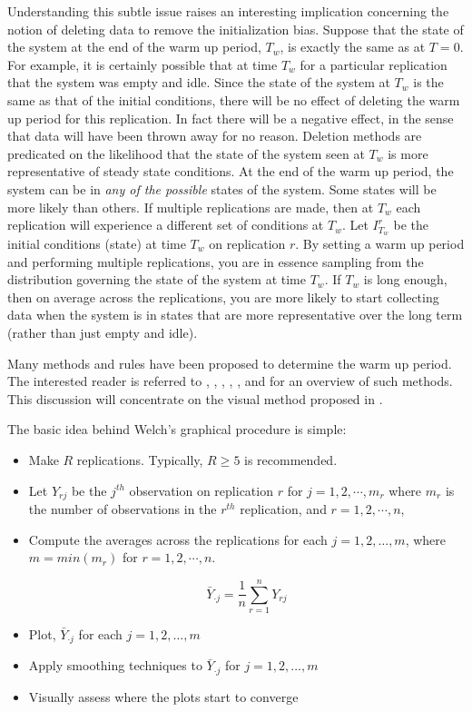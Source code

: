 \documentclass[
]{book}
\theoremstyle{definition}
\theoremstyle{definition}
\theoremstyle{definition}
\theoremstyle{definition}
\theoremstyle{remark}
\begin{document}
Understanding this subtle issue raises an interesting implication
concerning the notion of deleting data to remove the initialization
bias. Suppose that the state of the system at the end of the warm up
period, \(T_w\), is exactly the same as at \(T = 0\). For example, it is
certainly possible that at time \(T_w\) for a particular replication that
the system was empty and idle. Since the state of the system at \(T_w\) is
the same as that of the initial conditions, there will be no effect of
deleting the warm up period for this replication. In fact there will be
a negative effect, in the sense that data will have been thrown away for
no reason. Deletion methods are predicated on the likelihood that the
state of the system seen at \(T_w\) is more representative of steady state
conditions. At the end of the warm up period, the system can be in \emph{any
of the possible} states of the system. Some states will be more likely
than others. If multiple replications are made, then at \(T_w\) each
replication will experience a different set of conditions at \(T_w\). Let
\(I_{T_w}^r\) be the initial conditions (state) at time \(T_w\) on
replication \(r\). By setting a warm up period and performing multiple
replications, you are in essence sampling from the distribution
governing the state of the system at time \(T_w\). If \(T_w\) is long
enough, then on average across the replications, you are more likely to
start collecting data when the system is in states that are more
representative over the long term (rather than just empty and idle).

Many methods and rules have been proposed to determine the warm up
period. The interested reader is referred to \citep{wilson1978a}, \citet{lada2003a},
\citep{Litton:2002aa}, \citet{white2000a}, \citet{cash1992}, and \citep{rossetti1995control} for
an overview of such methods. This discussion will concentrate on the
visual method proposed in \citep{welch1983a}.

The basic idea behind Welch's graphical procedure is simple:

\begin{itemize}
\item
  Make \(R\) replications. Typically, \(R \geq 5\) is recommended.
\item
  Let \(Y_{rj}\) be the \(j^{th}\) observation on replication \(r\) for
  \(j = 1,2,\cdots,m_r\) where \(m_r\) is the number of observations in
  the \(r^{th}\) replication, and \(r = 1,2,\cdots,n\),
\item
  Compute the averages across the replications for each
  \(j = 1, 2, \ldots, m\), where \(m = min(m_r)\) for \(r = 1,2,\cdots,n\).

  \[\bar{Y}_{\cdot j} = \dfrac{1}{n}\sum_{r=1}^n Y_{rj}\]
\item
  Plot, \(\bar{Y}_{\cdot j}\) for each \(j = 1, 2, \ldots, m\)
\item
  Apply smoothing techniques to \(\bar{Y}_{\cdot j}\) for
  \(j = 1, 2, \ldots, m\)
\item
  Visually assess where the plots start to converge
\end{itemize}
\end{document}
